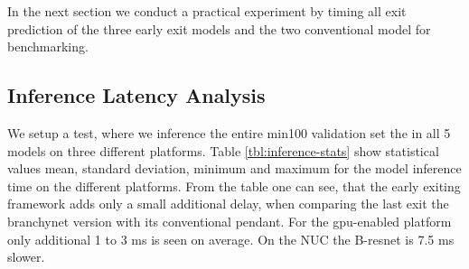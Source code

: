 In the next section we conduct a practical experiment by timing all exit prediction of the three early exit models and the two conventional model for benchmarking. 

\subsection{Inference Latency Analysis}

We setup a test, where we inference the entire \gls{min100} validation set the in all 5 models on three different platforms. Table \ref{tbl:inference-stats} show statistical values mean, standard deviation, minimum and maximum for the model inference time on the different platforms. From the table one can see, that the early exiting framework adds only a small additional delay, when comparing the last exit the \gls{branchynet} version with its conventional pendant. For the \gls{gpu}-enabled platform only additional 1 to 3 ms is seen on average. On the NUC the B-\gls{resnet} is 7.5 ms slower. 
